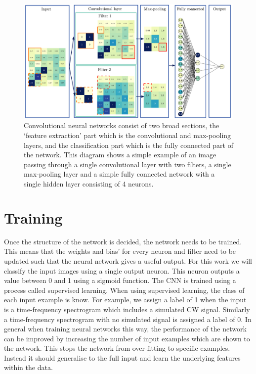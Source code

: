 \begin{figure}[h]
	\includegraphics[width=\textwidth]{C4_cnn/cnn_structure_ex.pdf}
	\caption{Convolutional neural networks consist of two broad sections, the `feature extraction' part which is the convolutional and max-pooling layers, and the classification part which is the fully connected part of the network. This diagram shows a simple example of an image passing through a single convolutional layer with two filters, a single max-pooling layer and a simple fully connected network with a single hidden layer consisting of 4 neurons. }
	\label{machine:cnn:structure:example}
\end{figure}


\section{\label{machine:training}Training}

%
Once the structure of the network is decided, the network needs to be trained.
This means that the weights and bias' for every neuron and filter need to be updated such
that the neural network gives a useful output. For this
work we will classify the input images using a single output neuron.
This neuron outputs a value between 0 and 1 using a sigmoid function.
The \ac{CNN} is trained using a process called supervised
learning. When using supervised learning, the class of each input example is know. For example, we assign a label of 1 when the
input is a time-frequency spectrogram which includes a simulated \ac{CW}
signal. Similarly a time-frequency spectrogram with no simulated signal is assigned a label of 0. 
In general when training neural networks this way, the performance of the network can be improved by increasing the number of input examples which are shown to the network.
This stops the network from over-fitting to specific examples. Instead it should generalise to the full input and learn the underlying features within the data.

